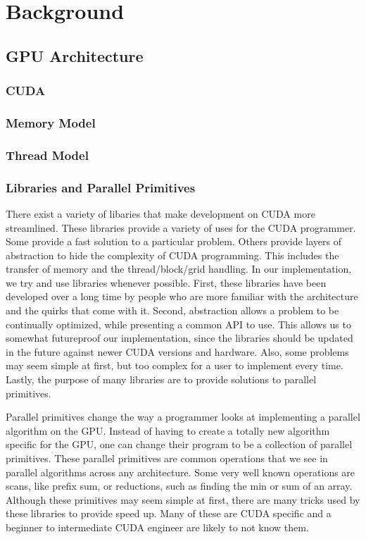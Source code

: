 \chapter{Background}

\section{GPU Architecture}

\subsection{CUDA}
\subsection{Memory Model}
\subsection{Thread Model}
\subsection{Libraries and Parallel Primitives}

There exist a variety of libaries that make development on CUDA more streamlined.
These libraries provide a variety of uses for the CUDA programmer.
Some provide a fast solution to a particular problem.
Others provide layers of abstraction to hide the complexity of CUDA programming.
This includes the transfer of memory and the thread/block/grid handling.
In our implementation, we try and use libraries whenever possible.
First, these libraries have been developed over a long time by people who are more familiar with the architecture and the quirks that come with it.
Second, abstraction allows a problem to be continually optimized, while presenting a common API to use.
This allows us to somewhat futureproof our implementation, since the libraries should be updated in the future against newer CUDA versions and hardware.
Also, some problems may seem simple at first, but too complex for a user to implement every time.
Lastly, the purpose of many libraries are to provide solutions to parallel primitives.

Parallel primitives change the way a programmer looks at implementing a parallel algorithm on the GPU.
Instead of having to create a totally new algorithm specific for the GPU, one can change their program to be a collection of parallel primitives.
These parallel primitives are common operations that we see in parallel algorithms across any architecture.
Some very well known operations are scans, like prefix sum, or reductions, such as finding the min or sum of an array.
Although these primitives may seem simple at first, there are many tricks used by these libraries to provide speed up.
Many of these are CUDA specific and a beginner to intermediate CUDA engineer are likely to not know them.

